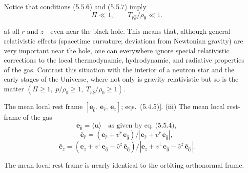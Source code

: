 Notice that conditions (5.5.6) and (5.5.7) imply
%
\begin{equation}
\Pi \ll 1, \qquad T_{\hat{r}\hat{k}}/\rho_0 \ll 1.
\tag{5.5.8}
\end{equation}

at all $r$ and $z$---even near the black hole.  This means that, although
general relativistic effects (spacetime curvature; deviations from
Newtonian gravity) are very important near the hole, one can everywhere
ignore special relativistic corrections to the local thermodynamic,
hydrodynamic, and radiative properties of the gas.  Contrast this
situation with the interior of a neutron star and the early stages of the
Universe, where not only is gravity relativistic but so is the matter
$(\Pi \geq 1,\; p/\rho_0 \geq 1,\; T_{\hat{r}\hat{k}}/\rho_0 \geq 1)$.

The mean local rest frame
$[\mathbf{e}_{\hat{0}},\,\mathbf{e}_{\hat{r}},\,\mathbf{e}_z]$;
eqs.\ (5.4.5)].  (iii)  The mean local rest-
frame of the gas
%
\begin{equation}
\bar{\mathbf{e}}_{\hat{0}} = \langle\mathbf{u}\rangle\quad
\text{as given by eq.\ (5.5.4)},
\end{equation}
%
\begin{equation}
\bar{\mathbf{e}}_{\hat{r}} = (\mathbf{e}_{\hat{r}} + v^{\hat{r}}\,\mathbf{e}_{\hat{0}})
/|\mathbf{e}_{\hat{r}} + v^{\hat{r}}\,\mathbf{e}_{\hat{0}}|,
\end{equation}
%
\begin{equation}
\bar{\mathbf{e}}_z = (\mathbf{e}_z + v^{\hat{z}}\,\mathbf{e}_{\hat{0}}
- \hat{v}^{\hat{z}}\,\bar{\mathbf{e}}_{\hat{0}})/
|\mathbf{e}_z + v^{\hat{z}}\,\mathbf{e}_{\hat{0}}
- \hat{v}^{\hat{z}}\,\bar{\mathbf{e}}_{\hat{0}}|.
\tag{5.5.9}
\end{equation}

The mean local rest frame is nearly identical to the orbiting orthonormal frame.
